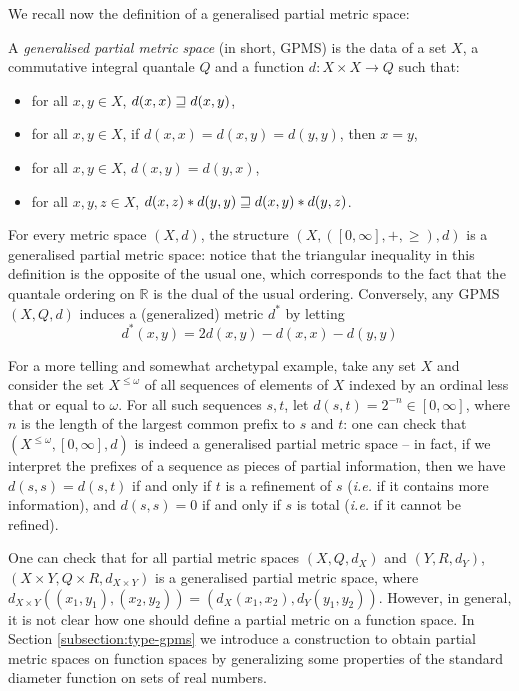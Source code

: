 We recall now the definition of a generalised partial metric space:


\begin{definition} A \emph{generalised partial metric space} (in short, GPMS) is the data of a set $X$, a commutative integral quantale $Q$ and a function $d : X \times X \to Q$ such that: \begin{itemize}
\item for all $x,y \in X$, $d(x,x) \sqsupseteq d(x,y)$,
\item for all $x,y \in X$, if $d(x,x) = d(x,y) = d(y,y)$, then $x = y$,
\item for all $x,y \in X$, $d(x,y) = d(y,x)$,
\item for all $x,y,z \in X$, $d(x,z) \mathbin{\ast} d(y,y) \sqsupseteq d(x,y) \mathbin{\ast} d(y,z)$.
\end{itemize}
\end{definition}

For every metric space $(X,d)$, the structure $(X, ([0,\infty], +, \geq), d)$ is a generalised partial metric space: notice that the triangular inequality in this definition is the opposite of the usual one, which corresponds to the fact that the quantale ordering on $\mathbb{R}$ is the dual of the usual ordering. 
Conversely, any GPMS $(X,Q,d)$ induces a (generalized) metric $d^{*}$ by letting 
\begin{equation}\label{eq:pmettomet}
d^{*}(x,y)=2d(x,y)-d(x,x)-d(y,y)
\end{equation}


For a more telling and somewhat archetypal example, take any set $X$ and consider the set $X^{\leq \omega}$ of all sequences of elements of $X$ indexed by an ordinal less that or equal to $\omega$. For all such sequences $s,t$, let $d(s,t) = 2^{-n} \in [0,\infty]$, where $n$ is the length of the largest common prefix to $s$ and $t$: one can check that $(X^{\leq \omega}, [0,\infty], d)$ is indeed a generalised partial metric space -- in fact, if we interpret the prefixes of a sequence as pieces of partial information, then we have $d(s,s) = d(s,t)$ if and only if $t$ is a refinement of $s$ (\textit{i.e.} if it contains more information), and $d(s,s) = 0$ if and only if $s$ is total (\textit{i.e.} if it cannot be refined).

One can check that for all partial metric spaces $(X, Q, d_X)$ and $(Y, R, d_Y)$, $(X \times Y, Q \times R, d_{X \times Y})$ is a generalised partial metric space, where $d_{X \times Y}((x_1, y_1), (x_2, y_2)) = (d_X(x_1, x_2), d_Y(y_1, y_2))$. However, in general, it is not clear how one should define a partial metric on a function space. In  Section \ref{subsection:type-gpms} we introduce a construction to obtain partial metric spaces on function spaces by generalizing some properties of the standard diameter function on sets of real numbers.
